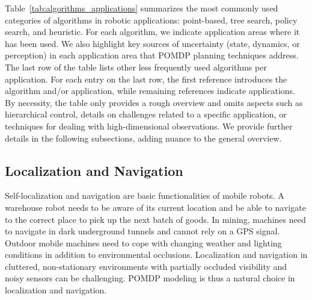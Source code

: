 \documentclass[journal]{IEEEtran}
\begin{document}
Table~\ref{tab:algorithms_applications} summarizes the most commonly used categories of algorithms in robotic applications: point-based, tree search, policy search, and heuristic.
%
For each algorithm, we indicate application areas where it has been used.
We also highlight key sources of uncertainty (state, dynamics, or perception) in each application area that {POMDP planning techniques address.}
{The last row of the table lists other less frequently used algorithms per application.
For each entry on the last row, the first reference introduces the algorithm and/or application, while remaining references indicate applications.}
By necessity, the table only provides a rough overview and omits aspects such as hierarchical control, details on challenges related to a specific application, or techniques for dealing with high-dimensional observations.
{We provide further details} in the following subsections, adding nuance to the general overview.


%
%
%
%
%
%
%
%
%

%
%
%
%
%
%
%
%
%
%
%
%
%
%
%
%
%
%
%
%
%
%
%
%
%
%
%
%
%
%
%
%
%
%
%
%
%
%
%
%
%
%
%
%
%
%
%
%
%
%
%
%
%
%
%
%
%
%
%
%
%
%
%
%
%
%
%
%
%
%
%
%
%
%
%
%
%
%
%
%
%
%
%
%
%
%
%
%
%
%
%
%
%
%
%
%
%
%
%
%
%
%
%
%
%
%
%
%
%
%
%
%
%
%
%
%
%
%
%
%
%
%
%
%
%
%
%
%
%
%
%
%
%
%
%
%
%
%
%
%
%
%
%
%
%
%
%
%
%
%
%
%
%
%
%
%
%
%
%
%
%
%
%
%
%
%
%
%
%
%
%
%
%
%
%
%
%
%
%
%
%
%
%
%
%
%
%
%
%
%
%
%
%
%
%
%
%
%
%
%
%
%
%
%
%
%
%
%
%
%
%
%
%
%
%
%
%
%
%
%
%
%
%
%
%
%
%
%
%
%
%
%
%
%
%
%
%
%
%
%
%
%
%
%
%
%
%
%
%
%
%
%
%
%
%
%
%
%
%
%
%
%
%
%
%
%
%
%
%
%
%
%
%
%
%
%
%
%
%
%
%
%
%
%
%
%
%

%
%
%
%
%
%
%
%
%
%
%
%
%
%
%
%
%
%
%
%
%
%
%
%
%
%
%
%
%
%
%
%
%
%
%
%
%
%
%
%
%
%
%
%
%
%
%
%
%
%
%
%
%
%
%
%
%
%
%


\subsection{Localization and Navigation}
\label{sec:localization_navigation}
Self-localization and navigation are basic functionalities of mobile robots.
A warehouse robot needs to be aware of its current
location and be able to navigate to the correct place to pick up the
next batch of goods. In mining, machines need to navigate in dark
underground tunnels and cannot rely on a GPS signal. Outdoor mobile
machines need to cope with changing weather and lighting conditions in
addition to environmental occlusions. Localization and navigation in
cluttered, non-stationary environments with partially occluded visibility and noisy
sensors can be challenging.
POMDP modeling is thus a natural choice in localization and navigation.
\end{document}
